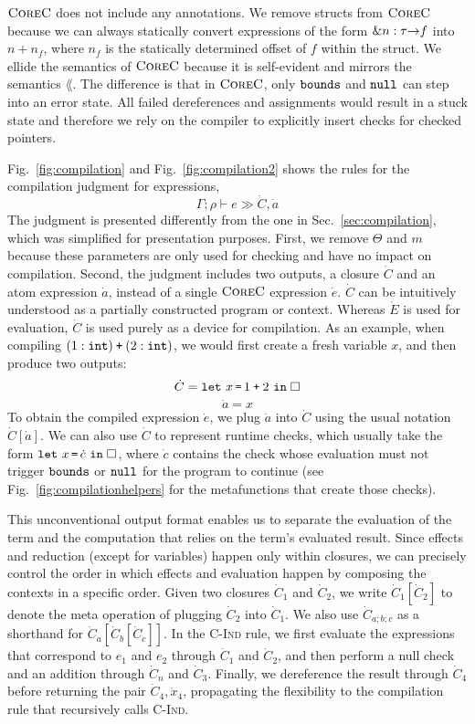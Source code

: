 $\textsc{CoreC}$ does not include any annotations. We remove structs from
$\textsc{CoreC}$ because we can always statically convert expressions of the form
$\mathtt{\&}{n:\tau}\mathtt{\rightarrow}{f}$ into $n + n_f$, where $n_f$ is the statically
determined offset of $f$ within the struct. We ellide the semantics of
$\textsc{CoreC}$ because it is self-evident and mirrors the semantics
$\lang$. The difference is that in $\textsc{CoreC}$, only $\mathtt{bounds}$ and
$\mathtt{null}$ can step into an error state. All failed dereferences and
assignments would result in a stuck state and therefore we rely on the
compiler to explicitly insert checks for checked pointers.


Fig.~\ref{fig:compilation} and Fig.~\ref{fig:compilation2}
 shows the rules for the compilation judgment for expressions,
\[\Gamma;\rho \vdash e \gg \dot C, \dot a\]
The judgment is presented differently from the one in
Sec.~\ref{sec:compilation}, which was simplified for presentation purposes. First,
we remove $\Theta$ and $m$ because these
parameters are only used for checking and have no
impact on compilation. Second, the judgment includes two
outputs, a closure $\dot C$ and an atom expression $\dot a$, instead of
a single $\textsc{CoreC}$ expression $\dot e$. $\dot C$ can be intuitively understood as a
partially constructed program or context. Whereas $\dot E$ is used for
evaluation, $\dot C$
is used purely as a device for compilation. As an example,
when compiling $(1 : \mathtt{int}) \mathbin{\texttt{+}} (2 : \mathtt{int})$, 
we would first create a fresh variable $x$, and then produce two outputs:
\[    \dot C = \mathtt{let}~x\, \texttt{=}\, 1 \mathbin{\texttt{+}} 2~\mathtt{in}\;{\Box}\]
\[    \dot a = x\]
To obtain the compiled expression $\dot e$, we plug $\dot a$ into
$\dot C$ using the usual notation $\dot C[\dot a]$. We can also use $\dot C$ to represent runtime checks, which
usually take the form $\mathtt{let}~x\, \texttt{=}\, \dot c~\mathtt{in}\;{\Box}$, where $\dot c$
contains the check whose evaluation must not trigger $\mathtt{bounds}$ or $\mathtt{null}$ for the program to
continue (see Fig.~\ref{fig:compilationhelpers} for the metafunctions that create
those checks). 

This unconventional output format enables us to separate the
evaluation of the term and the computation that relies on the term's
evaluated result. Since effects and reduction (except for variables) happen only
within closures, we can precisely control the order in which effects
and evaluation happen by composing the contexts in a specific order.
Given two closures $\dot C_1$
and $\dot C_2$, we write $\dot C_1[\dot C_2]$ to denote the meta
operation of plugging $\dot C_2$ into $\dot C_1$. We also use
$\dot C_{a;b;c}$ as a shorthand for $\dot C_a[\dot C_b[\dot C_c]]$. In
the \textsc{C-Ind} rule,
we first evaluate the expressions that correspond to $e_1$ and $e_2$
through $\dot C_1$ and $\dot C_2$, and then perform a null check and
an addition through $\dot C_n$ and $\dot C_3$. Finally, we dereference
the result through $\dot C_4$ before returning the pair $\dot C_4,\dot
x_4$, propagating the flexibility to the compilation rule that recursively
calls \textsc{C-Ind}.

